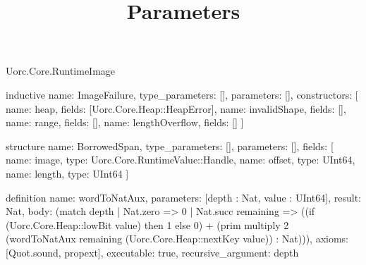 \begin{lexlean}{Uorc.Core.RuntimeImage}



\title{Parameters}

\begin{semanticmodule}
inductive{
  name: ImageFailure,
  type_parameters: [],
  parameters: [],
  constructors: [
    {name: heap, fields: [Uorc.Core.Heap::HeapError]},
    {name: invalidShape, fields: []},
    {name: range, fields: []},
    {name: lengthOverflow, fields: []}
  ]
}

structure{
  name: BorrowedSpan,
  type_parameters: [],
  parameters: [],
  fields: [
    {name: image, type: Uorc.Core.RuntimeValue::Handle},
    {name: offset, type: UInt64},
    {name: length, type: UInt64}
  ]
}

definition{
  name: wordToNatAux,
  parameters: [depth : Nat, value : UInt64],
  result: Nat,
  body: (match depth
    | Nat.zero => 0
    | Nat.succ remaining => ((if (Uorc.Core.Heap::lowBit value) then 1 else 0) + (prim multiply 2 (wordToNatAux remaining (Uorc.Core.Heap::nextKey value)) : Nat))),
  axioms: [Quot.sound, propext],
  executable: true,
  recursive_argument: depth
}


\end{semanticmodule}
\end{lexlean}
